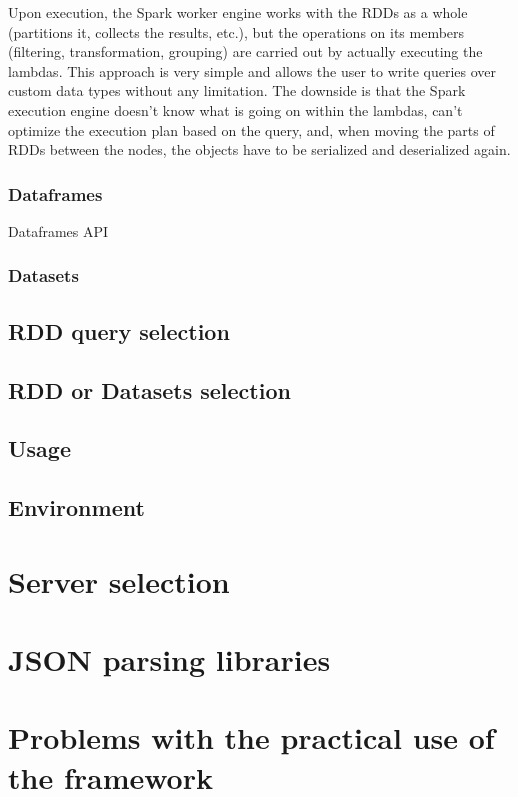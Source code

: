 Upon execution, the Spark worker engine works with the RDDs as a whole (partitions it, collects the results, etc.), but the operations on its members (filtering, transformation, grouping) are carried out by actually executing the lambdas. This approach is very simple and allows the user to write queries over custom data types without any limitation. The downside is that the Spark execution engine doesn't know what is going on within the lambdas, can't optimize the execution plan based on the query, and, when moving the parts of RDDs between the nodes, the objects have to be serialized and deserialized again.

\subsubsection{Dataframes}

Dataframes API 

\subsubsection{Datasets}
\subsection{RDD query selection}
\subsection{RDD or Datasets selection}
\subsection{Usage}
\subsection{Environment}
\section{Server selection}

\section{JSON parsing libraries}
\label{subsec:jsonparsing}

\section{Problems with the practical use of the framework}

